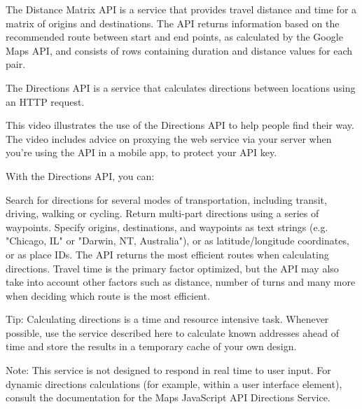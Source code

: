 The Distance Matrix API is a service that provides travel distance and time for a matrix of origins and destinations. The API returns information based on the recommended route between start and end points, as calculated by the Google Maps API, and consists of rows containing duration and distance values for each pair.


The Directions API is a service that calculates directions between locations using an HTTP request.

This video illustrates the use of the Directions API to help people find their way. The video includes advice on proxying the web service via your server when you're using the API in a mobile app, to protect your API key.


With the Directions API, you can:

Search for directions for several modes of transportation, including transit, driving, walking or cycling.
Return multi-part directions using a series of waypoints.
Specify origins, destinations, and waypoints as text strings (e.g. "Chicago, IL" or "Darwin, NT, Australia"), or as latitude/longitude coordinates, or as place IDs.
The API returns the most efficient routes when calculating directions. Travel time is the primary factor optimized, but the API may also take into account other factors such as distance, number of turns and many more when deciding which route is the most efficient.

Tip: Calculating directions is a time and resource intensive task. Whenever possible, use the service described here to calculate known addresses ahead of time and store the results in a temporary cache of your own design.

Note: This service is not designed to respond in real time to user input. For dynamic directions calculations (for example, within a user interface element), consult the documentation for the Maps JavaScript API Directions Service.
